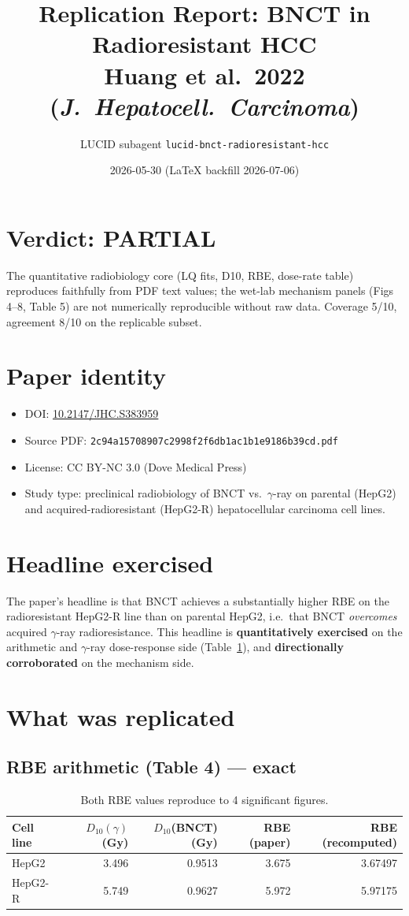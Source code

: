 \documentclass[11pt]{article}
\title{Replication Report: BNCT in Radioresistant HCC\\
       \large Huang et al.\ 2022 (\textit{J.\ Hepatocell.\ Carcinoma})}
\author{LUCID subagent \texttt{lucid-bnct-radioresistant-hcc}}
\date{2026-05-30 (LaTeX backfill 2026-07-06)}
\begin{document}
\maketitle

\section*{Verdict: PARTIAL}
The quantitative radiobiology core (LQ fits, D10, RBE, dose-rate table) reproduces
faithfully from PDF text values; the wet-lab mechanism panels (Figs 4--8, Table 5)
are not numerically reproducible without raw data. Coverage 5/10, agreement 8/10
on the replicable subset.

\section{Paper identity}
\begin{itemize}
  \item DOI: \href{https://doi.org/10.2147/JHC.S383959}{10.2147/JHC.S383959}
  \item Source PDF: \texttt{2c94a15708907c2998f2f6db1ac1b1e9186b39cd.pdf}
  \item License: CC BY-NC 3.0 (Dove Medical Press)
  \item Study type: preclinical radiobiology of BNCT vs.\ $\gamma$-ray on
        parental (HepG2) and acquired-radioresistant (HepG2-R) hepatocellular
        carcinoma cell lines.
\end{itemize}

\section{Headline exercised}
The paper's headline is that BNCT achieves a substantially higher RBE on the
radioresistant HepG2-R line than on parental HepG2, i.e.\ that BNCT
\emph{overcomes} acquired $\gamma$-ray radioresistance. This headline is
\textbf{quantitatively exercised} on the arithmetic and $\gamma$-ray dose-response
side (Table~\ref{tab:rbe}), and \textbf{directionally corroborated} on the
mechanism side.

\section{What was replicated}

\subsection{RBE arithmetic (Table 4) --- exact}
\begin{table}[h]\centering
\begin{tabular}{lrrrr}
\toprule
Cell line & $D_{10}(\gamma)$ (Gy) & $D_{10}$(BNCT) (Gy) & RBE (paper) & RBE (recomputed) \\
\midrule
HepG2   & 3.496 & 0.9513 & 3.675 & 3.67497 \\
HepG2-R & 5.749 & 0.9627 & 5.972 & 5.97175 \\
\bottomrule
\end{tabular}
\caption{Both RBE values reproduce to 4 significant figures.}
\label{tab:rbe}
\end{table}
\end{document}
